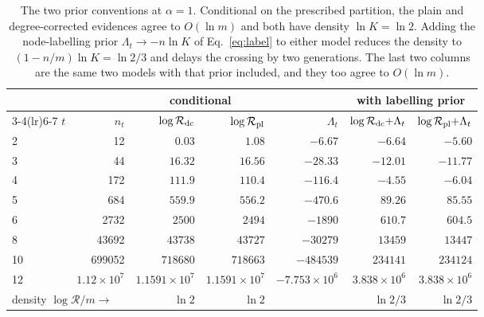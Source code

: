 \documentclass[preprint,12pt]{elsarticle}
\newcommand{\Rev}{\mathcal{R}}
\newcommand{\logR}{\log \Rev}
\newcommand{\Nof}{n_t}
\begin{document}
\begin{table}[tb]
  \centering
  \caption{The two prior conventions at $\alpha=1$. Conditional on the
  prescribed partition, the plain and degree-corrected evidences agree to
  $O(\ln m)$ and both have density $\ln K=\ln 2$. Adding the node-labelling
  prior $\Lambda_t\to-n\ln K$ of Eq.~\eqref{eq:label} to either model reduces
  the density to $(1-n/m)\ln K=\ln2/3$ and delays the crossing by two
  generations. The last two columns are the same two models with that prior
  included, and they too agree to $O(\ln m)$.}
  \label{tab:conventions}
  \footnotesize
  \setlength{\tabcolsep}{4pt}
  \begin{tabular}{lrrrrrr}
    \toprule
    & & \multicolumn{2}{c}{conditional} & &
    \multicolumn{2}{c}{with labelling prior}\\
    \cmidrule(lr){3-4}\cmidrule(lr){6-7}
    $t$ & $\Nof$ & $\logR_{\rm dc}$ & $\logR_{\rm pl}$ & $\Lambda_t$
        & $\logR_{\rm dc}{+}\Lambda_t$ & $\logR_{\rm pl}{+}\Lambda_t$\\
    \midrule
    2  & 12       & $0.03$   & $1.08$   & $-6.67$    & $-6.64$   & $-5.60$\\
    3  & 44       & $16.32$  & $16.56$  & $-28.33$   & $-12.01$  & $-11.77$\\
    4  & 172      & $111.9$  & $110.4$  & $-116.4$   & $-4.55$   & $-6.04$\\
    5  & 684      & $559.9$  & $556.2$  & $-470.6$   & $89.26$   & $85.55$\\
    6  & 2732     & $2500$   & $2494$   & $-1890$    & $610.7$   & $604.5$\\
    8  & 43692    & $43738$  & $43727$  & $-30279$   & $13459$   & $13447$\\
    10 & 699052   & $718680$ & $718663$ & $-484539$  & $234141$  & $234124$\\
    12 & $1.12{\times}10^{7}$ & $1.1591{\times}10^{7}$ & $1.1591{\times}10^{7}$
       & $-7.753{\times}10^{6}$ & $3.838{\times}10^{6}$
       & $3.838{\times}10^{6}$\\
    \midrule
    \multicolumn{2}{l}{density $\logR/m\to$}
       & $\ln2$ & $\ln2$ & & $\ln2/3$ & $\ln2/3$\\
    \bottomrule
  \end{tabular}
\end{table}
\end{document}

